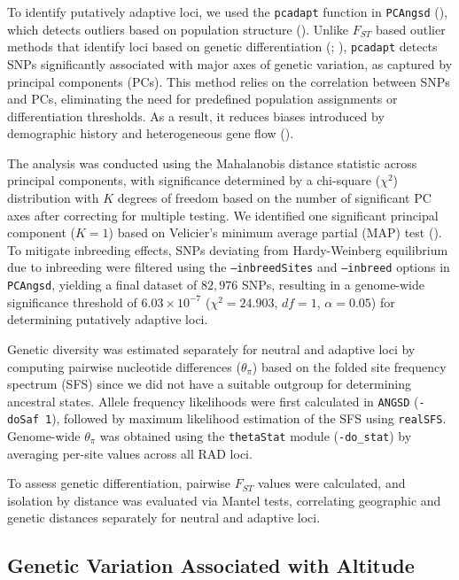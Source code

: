 \documentclass[9pt,a4paper,twoside]{rho-class/rho}
\begin{document}
        To identify putatively adaptive loci, we used the \texttt{pcadapt} function in \texttt{PCAngsd} (\cite{Meisner2018}), which detects outliers based on population structure (\cite{Luu2017}). Unlike $F_{ST}$ based outlier methods that identify loci based on genetic differentiation (\cite{antao2008}; \cite{whitlock2015}), \texttt{pcadapt} detects SNPs significantly associated with major axes of genetic variation, as captured by principal components (PCs). This method relies on the correlation between SNPs and PCs, eliminating the need for predefined population assignments or differentiation thresholds. As a result, it reduces biases introduced by demographic history and heterogeneous gene flow (\cite{Luu2017}).
        
        The analysis was conducted using the Mahalanobis distance statistic across principal components, with significance determined by a chi-square ($\chi^2$) distribution with $K$ degrees of freedom based on the number of significant PC axes after correcting for multiple testing. We identified one significant principal component ($K = 1$) based on Velicier’s minimum average partial (MAP) test (\cite{Shriner2011}). To mitigate inbreeding effects, SNPs deviating from Hardy-Weinberg equilibrium due to inbreeding were filtered using the \texttt{--inbreedSites} and \texttt{--inbreed} options in \texttt{PCAngsd}, yielding a final dataset of $82,976$ SNPs, resulting in a genome-wide significance threshold of $6.03 \times 10^{-7}$ ($\chi^2 = 24.903$, $df = 1$, $\alpha = 0.05$) for determining putatively adaptive loci.

        Genetic diversity was estimated separately for neutral and adaptive loci by computing pairwise nucleotide differences ($\theta_{\pi}$) based on the folded site frequency spectrum (SFS) since we did not have a suitable outgroup for determining ancestral states. Allele frequency likelihoods were first calculated in \texttt{ANGSD} (\texttt{-doSaf 1}), followed by maximum likelihood estimation of the SFS using \texttt{realSFS}. Genome-wide $\theta_{\pi}$ was obtained using the \texttt{thetaStat} module (\texttt{-do\_stat}) by averaging per-site values across all RAD loci.

        To assess genetic differentiation, pairwise $F_{ST}$ values were calculated, and isolation by distance was evaluated via Mantel tests, correlating geographic and genetic distances separately for neutral and adaptive loci.


    \subsection{Genetic Variation Associated with Altitude}
    
\end{document}
